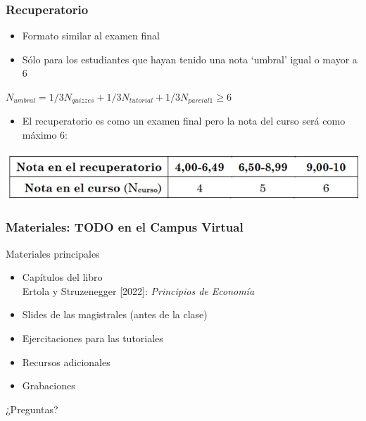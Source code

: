 \documentclass{beamer}
\begin{document}
\begin{frame}
\frametitle{Recuperatorio}
\begin{itemize}
    \item Formato similar al examen final \vspace{2mm}
    \item Sólo para los estudiantes que hayan tenido una nota ‘umbral’ igual o mayor a 6
\end{itemize}
    \begin{center}
        $N_{umbral}=1/3N_{quizzes}+1/3N_{tutorial}+1/3N_{parcial 1} \geq 6$
    \end{center}
    
\begin{itemize}
    \item El recuperatorio es como un examen final pero la nota del curso será como máximo 6:
\end{itemize}
\centering
\includegraphics[scale=0.6]{../Figures/notarecup.jpg}

\end{frame}

\begin{frame}
\frametitle{Materiales: TODO en el Campus Virtual}
Materiales principales
\begin{itemize}
    \item Capítulos del libro \vspace{2mm}  \\
    Ertola y Struzenegger [2022]:  \textit{Principios de Economía} \vspace{2mm} 
    \item Slides de las magistrales (antes de la clase) \vspace{2mm}
    \item Ejercitaciones para las tutoriales \vspace{2mm}
    \item Recursos adicionales \vspace{2mm}
    \item Grabaciones \vspace{2mm}
\end{itemize}
\end{frame}


\begin{frame}
\begin{center}
    \Huge ¿Preguntas?
\end{center}
\end{frame}
\end{document}

